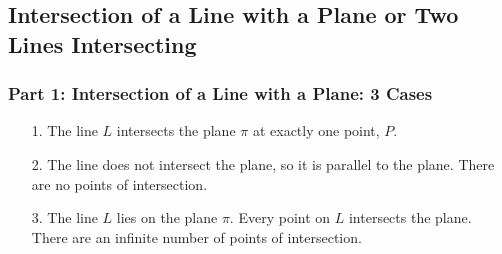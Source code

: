 \documentclass{article}
\begin{document}
\subsection{Intersection of a Line with a Plane or Two Lines Intersecting}
\subsubsection{Part 1: Intersection of a Line with a Plane: 3 Cases}
\begin{enumerate}
    \item[1.] The line \( L \) intersects the plane \( \pi \) at exactly one point, \( P \).
    \item[2.] The line does not intersect the plane, so it is parallel to the plane. There are no points of intersection.
    \item[3.] The line \( L \) lies on the plane \( \pi \). Every point on \( L \) intersects the plane. There are an infinite number of points of intersection.
\end{enumerate}
\end{document}
